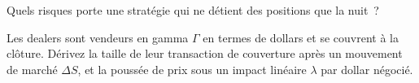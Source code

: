 \begin{interviewq}\label{iq:s1:intraday-patterns:5}
Quels risques porte une stratégie qui ne détient des positions que la nuit~?
\end{interviewq}

\begin{interviewq}\label{iq:s1:intraday-patterns:6}
Les dealers sont vendeurs en gamma $\Gamma$ en termes de dollars et se couvrent à la clôture. Dérivez la taille de leur transaction de couverture après un mouvement de marché $\Delta S$, et la poussée de prix
sous un impact linéaire $\lambda$ par dollar négocié.
\end{interviewq}

